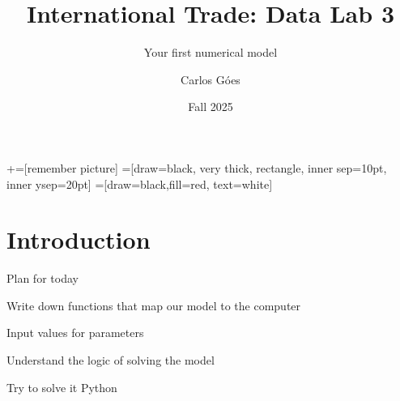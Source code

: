 \documentclass[notes,11pt, aspectratio=169, xcolor=table]{beamer}
\title[]{International Trade: Data Lab 3}
\subtitle[]{Your first numerical model}
\author[Góes]
{Carlos Góes\inst{1}}
\date{Fall 2025}
\institute[GWU]{\inst{1} George Washington University }
\newenvironment{wideitemize}{\itemize\addtolength{\itemsep}{10pt}}{\enditemize}
\begin{document}
\newcommand\marktopleft[1]{%
    \tikz[overlay,remember picture] 
        \node (marker-#1-a) at (-.3em,.3em) {};%
}
\newcommand\markbottomright[2]{%
    \tikz[overlay,remember picture] 
        \node (marker-#1-b) at (0em,0em) {};%
}
+=[remember picture] 
 =[draw=black, very thick, rectangle, inner sep=10pt, inner ysep=20pt]
 =[draw=black,fill=red, text=white]















\frame{\titlepage}
\addtocounter{framenumber}{-1}




\section{Introduction}

\begin{frame}{Plan for today}

\begin{wideitemize}
    \item Write down functions that map our model to the computer
    \item Input values for parameters
    \item Understand the logic of solving the model
    \item Try to solve it Python
\end{wideitemize}
    
\end{frame}
\end{document}
